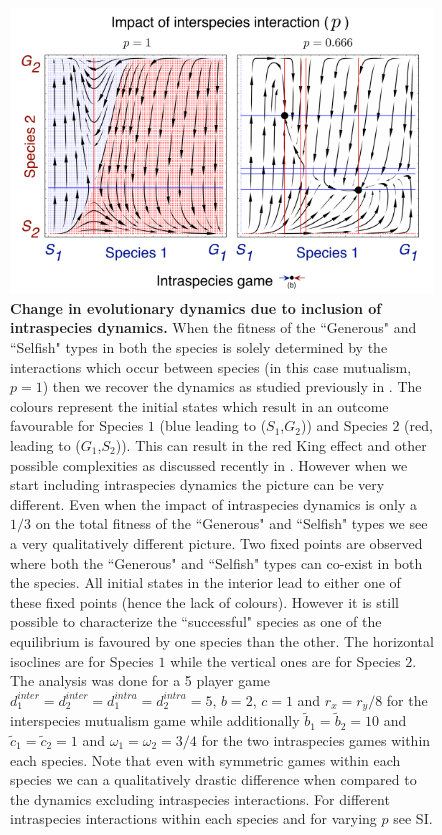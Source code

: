 \documentclass[12pt]{article}
\begin{document}
\begin{figure}
\begin{center}
\includegraphics[width=\columnwidth]{../Figures/mainexample2.pdf}
\caption{\small{
\textbf{Change in evolutionary dynamics due to inclusion of intraspecies dynamics.} When the fitness of the ``Generous" and ``Selfish" types in both the species is solely determined by the interactions which occur between species (in this case mutualism, $p=1$) then we recover the dynamics as studied previously in \citep{gokhale:PRSB:2012}. The colours represent the initial states which result in an outcome favourable for Species $1$ (blue leading to ($S_1$,$G_2$)) and Species $2$ (red, leading to ($G_1$,$S_2$)). This can result in the red King effect and other possible complexities as discussed recently in \citep{gao:SciRep:2015}. However when we start including intraspecies dynamics the picture can be very different.
Even when the impact of intraspecies dynamics is only a $1/3$ on the total fitness of the ``Generous" and ``Selfish" types we see a very qualitatively different picture.
Two fixed points are observed where both the ``Generous" and ``Selfish" types can co-exist in both the species.
All initial states in the interior lead to either one of these fixed points (hence the lack of colours).
However it is still possible to characterize the ``successful" species as one of the equilibrium is favoured by one species than the other.
The horizontal isoclines are for Species $1$ while the vertical ones are for Species $2$.
The analysis was done for a 5 player game $d_1^{inter} = d_2^{inter} = d_1^{intra} = d_2^{intra} = 5$, $b=2$, $c=1$ and $r_x = r_y /8$ for the interspecies mutualism game while additionally $\tilde{b}_1 = \tilde{b}_2 = 10$ and $\tilde{c}_1 = \tilde{c}_2 = 1$ and $\omega_1 = \omega_2 = 3/4$ for the two intraspecies games within each species. Note that even with symmetric games within each species we can a qualitatively drastic difference when compared to the dynamics excluding intraspecies interactions.  For different intraspecies interactions within each species and for varying $p$ see SI.}
\label{fig:mainexampleone}
}
\end{center}
\end{figure}
\end{document}
